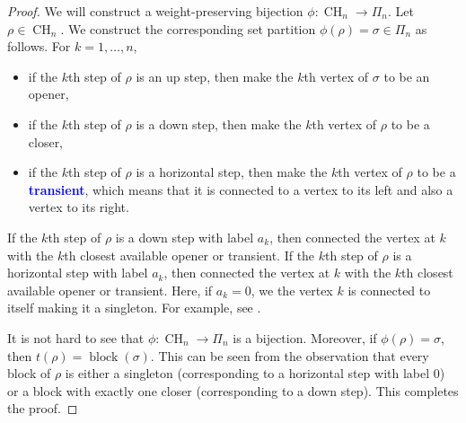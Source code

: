 \documentclass[oneside]{book}
\numberwithin{equation}{section}
\theoremstyle{definition}
\newcommand\block{\operatorname{block}}
\newcommand\CH{\operatorname{CH}}
\renewcommand\emph[1]{\textcolor{blue}{\bf #1}}
\begin{document}
\begin{proof}
  We will construct a weight-preserving bijection
  \( \phi:\CH_n\to \Pi_n \). Let \( \rho\in \CH_n \). We construct the
  corresponding set partition \( \phi(\rho) = \sigma\in\Pi_n \) as
  follows. For \( k= 1,\dots,n \),
\begin{itemize}
\item if the \( k \)th step of \( \rho \) is an up step, then make the
  \( k \)th vertex of \( \sigma \) to be an opener,
\item if the \( k \)th step of \( \rho \) is a down step, then make
  the \( k \)th vertex of \( \rho \) to be a closer,
\item if the \( k \)th step of \( \rho \) is a horizontal step, then
  make the \( k \)th vertex of \( \rho \) to be a \emph{transient},
  which means that it is connected to a vertex to its left and also a
  vertex to its right.
\end{itemize}
If the \( k \)th step of \( \rho \) is a down step with label
\( a_k \), then connected the vertex at \( k \) with the \( k \)th
closest available opener or transient. If the \( k \)th step of
\( \rho \) is a horizontal step with label \( a_k \), then connected
the vertex at \( k \) with the \( k \)th closest available opener or
transient. Here, if \( a_k=0 \), we the vertex \( k \) is connected to
itself making it a singleton. For example, see
.

It is not hard to see that \( \phi:\CH_n\to \Pi_n \) is a bijection.
Moreover, if \( \phi(\rho) = \sigma \), then
\( t(\rho) = \block(\sigma) \). This can be seen from the observation
that every block of \( \rho \) is either a singleton (corresponding to
a horizontal step with label \( 0 \)) or a block with exactly one
closer (corresponding to a down step). This completes the proof.
\end{proof}
\end{document}
